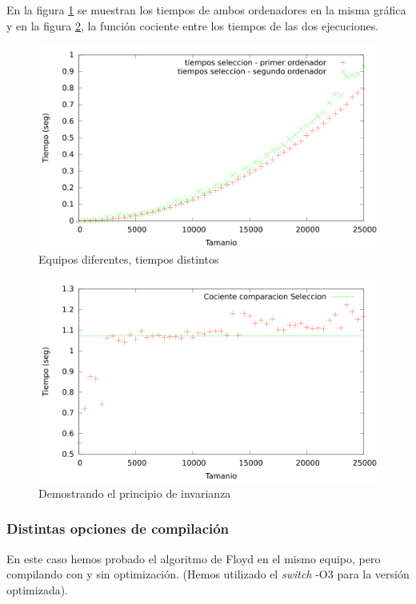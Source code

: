 \documentclass{article}
\begin{document}
En la figura \ref{fig:compSeleccion} se muestran los tiempos de ambos ordenadores en la misma gráfica y en la figura \ref{fig:compSeleccion_cociente}, la función cociente entre los tiempos de las dos ejecuciones.
\begin{figure}[H]
	\centering
	\includegraphics[totalheight=8cm]{img/compSeleccion}
	\caption{Equipos diferentes, tiempos distintos}
	\label{fig:compSeleccion}
\end{figure}
\begin{figure}[H]
	\centering
	\includegraphics[totalheight=8cm]{img/compSeleccion_cociente}
	\caption{Demostrando el principio de invarianza}
	\label{fig:compSeleccion_cociente}
\end{figure}
\subsubsection{Distintas opciones de compilación}
En este caso hemos probado el algoritmo de Floyd en el mismo equipo, pero compilando con y sin optimización. (Hemos utilizado el \textit{switch} -O3 para la versión optimizada).
\end{document}
